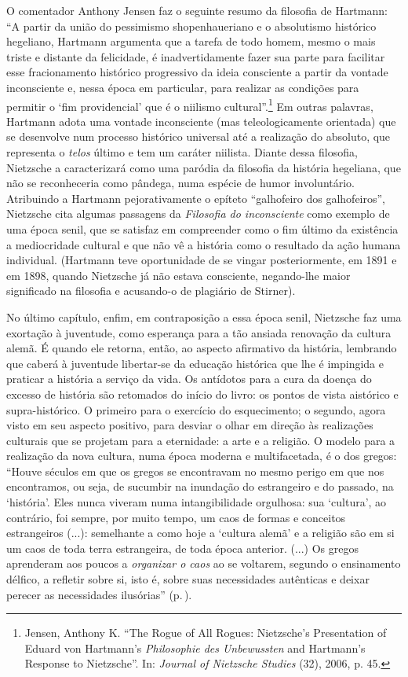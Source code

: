 O comentador Anthony Jensen faz o seguinte resumo da filosofia de
Hartmann: ``A partir da união do pessimismo shopenhaueriano e o
absolutismo histórico hegeliano, Hartmann argumenta que a tarefa de todo
homem, mesmo o mais triste e distante da felicidade, é inadvertidamente
fazer sua parte para facilitar esse fracionamento histórico progressivo
da ideia consciente a partir da vontade inconsciente e, nessa época em
particular, para realizar as condições para permitir o `fim
providencial' que é o niilismo cultural''.\footnote{Jensen, Anthony K.
  ``The Rogue of All Rogues: Nietz\-sche's Presentation of Eduard von
  Hartmann's \emph{Philosophie des Unbewussten} and Hartmann's Response
  to Nietz\-sche''. In: \emph{Journal of Nietz\-sche Studies} (32), 2006, p.
  45.} Em outras palavras, Hartmann adota uma vontade inconsciente (mas
teleologicamente orientada) que se desenvolve num processo histórico
universal até a realização do absoluto, que representa o \emph{telos}
último e tem um caráter niilista. Diante dessa filosofia, Nietz\-sche a
caracterizará como uma paródia da filosofia da história hegeliana, que
não se reconheceria como pândega, numa espécie de humor involuntário.
Atribuindo a Hartmann pejorativamente o epíteto ``galhofeiro dos
galhofeiros'', Nietz\-sche cita algumas passagens da \emph{Filosofia do
inconsciente} como exemplo de uma época senil, que se satisfaz em
compreender como o fim último da existência a mediocridade cultural e
que não vê a história como o resultado da ação humana individual.
(Hartmann teve oportunidade de se vingar posteriormente, em 1891 e em
1898, quando Nietz\-sche já não estava consciente, negando-lhe maior
significado na filosofia e acusando-o de plagiário de Stirner).

No último capítulo, enfim, em contraposição a essa época senil,
Nietz\-sche faz uma exortação à juventude, como esperança para a tão
ansiada renovação da cultura alemã. É quando ele retorna, então, ao
aspecto afirmativo da história, lembrando que caberá à juventude
libertar-se da educação histórica que lhe é impingida e praticar a
história a serviço da vida. Os antídotos para a cura da doença do
excesso de história são retomados do início do livro: os pontos de vista
aistórico e supra-histórico. O primeiro para o exercício do
esquecimento; o segundo, agora visto em seu aspecto positivo, para
desviar o olhar em direção às realizações culturais que se projetam para
a eternidade: a arte e a religião. O modelo para a realização da nova
cultura, numa época moderna e multifacetada, é o dos gregos: ``Houve
séculos em que os gregos se encontravam no mesmo perigo em que nos
encontramos, ou seja, de sucumbir na inundação do estrangeiro e do
passado, na `história'. Eles nunca viveram numa intangibilidade
orgulhosa: sua `cultura', ao contrário, foi sempre, por muito tempo, um
caos de formas e conceitos estrangeiros (...): semelhante a como hoje a
`cultura alemã' e a religião são em si um caos de toda terra
estrangeira, de toda época anterior. (...) Os gregos aprenderam aos
poucos a \emph{organizar o caos} ao se voltarem, segundo o ensinamento
délfico, a refletir sobre si, isto é, sobre suas necessidades autênticas
e deixar perecer as necessidades ilusórias'' (p.\,\pageref{necessidadesilusorias}).

